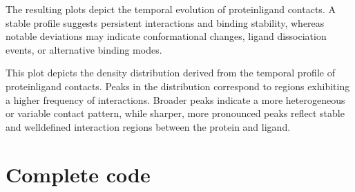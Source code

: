\documentclass[a4paper,10pt,english]{sphinxmanual}
\let\sphinxpxdimen\pdfpxdimen\else\newdimen\sphinxpxdimen
\begin{document}
\noindent{}

\sphinxAtStartPar
{} The resulting plots depict the temporal evolution of protein\sphinxhyphen{}ligand contacts. A stable profile suggests persistent interactions and binding stability, whereas notable deviations may indicate conformational changes, ligand dissociation events, or alternative binding modes.

\begin{sphinxVerbatim}[commandchars=\\\{\}]
  
\end{sphinxVerbatim}

\noindent{\hspace*{\fill}\sphinxincludegraphics[width=500\sphinxpxdimen]{{Contacts_density}.png}\hspace*{\fill}}

\sphinxAtStartPar
{} This plot depicts the density distribution derived from the temporal profile of protein\sphinxhyphen{}ligand contacts. Peaks in the distribution correspond to regions exhibiting a higher frequency of interactions. Broader peaks indicate a more heterogeneous or variable contact pattern, while sharper, more pronounced peaks reflect stable and well\sphinxhyphen{}defined interaction regions between the protein and ligand.


\section{Complete code}
\label{\detokenize{Contacts:complete-code}}
\begin{sphinxVerbatim}[commandchars=\\\{\}]
 
\end{sphinxVerbatim}

\begin{sphinxVerbatim}[commandchars=\\\{\}]
\end{sphinxVerbatim}
\end{document}
